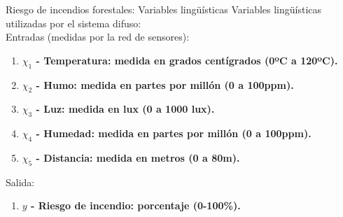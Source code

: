 \documentclass{beamer}
\begin{document}
\begin{frame}{Riesgo de incendios forestales: Variables lingüísticas}
Variables lingüísticas utilizadas por el sistema difuso:
\\
\vspace{0.3cm}
	Entradas (medidas por la red de sensores):
	\begin{enumerate}
	   \item \bfseries $\chi_1$ - Temperatura: \normalfont medida en grados centígrados (0ºC a 120ºC).
	   \item \bfseries $\chi_2$ - Humo: \normalfont medida en partes por millón (0 a 100ppm).
	   \item \bfseries $\chi_3$ - Luz: \normalfont medida en lux (0 a 1000 lux).
	   \item \bfseries $\chi_4$ - Humedad: \normalfont medida en partes por millón (0 a 100ppm).
	   \item \bfseries $\chi_5$ - Distancia: \normalfont medida en metros (0 a 80m).
	\end{enumerate}
	\vspace{0.2cm}
	Salida:
	\begin{enumerate}
	   \item \bfseries $y$ - Riesgo de incendio: \normalfont porcentaje (0-100\%).
	\end{enumerate}
\end{frame}
\end{document}
